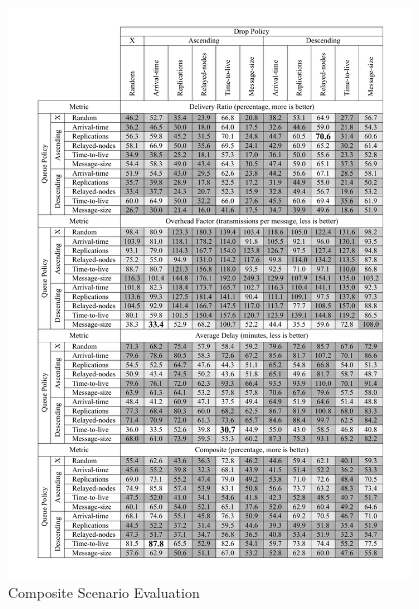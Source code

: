 \documentclass[conference,10pt,letterpaper,final]{IEEEtran}
\begin{document}
\begin{figure}[h]
	\centering
	\includegraphics[width=0.95\textwidth]{graphics/tables/composite_scenario_evaluation}
	\caption{Composite Scenario Evaluation}
	\label{results:compositescenario}
\end{figure}




% 


\end{document}
